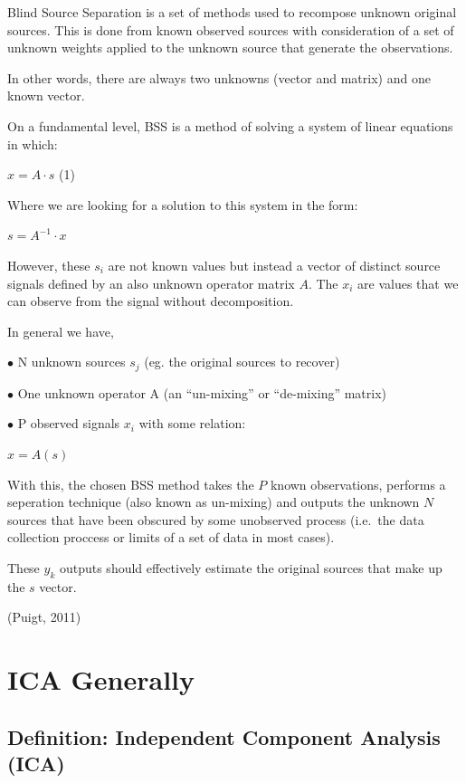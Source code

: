 \documentclass[12pt,twoside]{amherstthesis}
\begin{document}
  Blind Source Separation is a set of methods used to recompose unknown
  original sources. This is done from known observed sources with
  consideration of a set of unknown weights applied to the unknown source
  that generate the observations.
  
  In other words, there are always two unknowns (vector and matrix) and
  one known vector.
  
  On a fundamental level, BSS is a method of solving a system of linear
  equations in which:
  
  \(x = A\cdot s\) (1)
  
  Where we are looking for a solution to this system in the form:
  
  \(s = A^{-1}\cdot x\)
  
  However, these \(s_i\) are not known values but instead a vector of
  distinct source signals defined by an also unknown operator matrix
  \(A\). The \(x_i\) are values that we can observe from the signal
  without decomposition.
  
  In general we have,
  
  \(\bullet\) N unknown sources \(s_j\) (eg. the original sources to
  recover)
  
  \(\bullet\) One unknown operator A (an ``un-mixing'' or ``de-mixing''
  matrix)
  
  \(\bullet\) P observed signals \(x_i\) with some relation:
  
  \(x = A(s)\)
  
  With this, the chosen BSS method takes the \(P\) known observations,
  performs a seperation technique (also known as un-mixing) and outputs
  the unknown \(N\) sources that have been obscured by some unobserved
  process (i.e.~the data collection proccess or limits of a set of data in
  most cases).
  
  These \(y_k\) outputs should effectively estimate the original sources
  that make up the \(s\) vector.
  
  (Puigt, 2011)
  
  \section{ICA Generally}\label{ica-generally}
  
  \subsection{Definition: Independent Component Analysis
  (ICA)}\label{definition-independent-component-analysis-ica}
  
\end{document}
